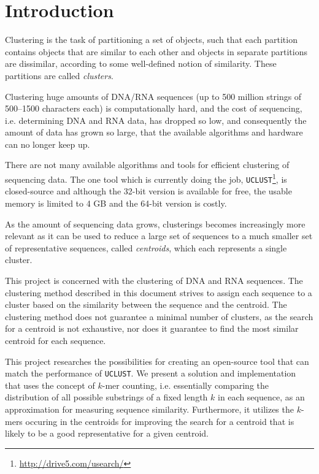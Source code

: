 \section{Introduction}

Clustering is the task of partitioning a set of objects, such that each
partition contains objects that are similar to each other and objects in
separate partitions are dissimilar, according to some well-defined notion of
similarity. These partitions are called \emph{clusters}.


Clustering huge amounts of DNA/RNA sequences (up to 500 million strings of
500--1500 characters each) is computationally hard, and the cost of sequencing,
i.e. determining DNA and RNA data, has dropped so low, and consequently the
amount of data has grown so large, that the available algorithms and hardware
can no longer keep up.~\cite{rothberg}

There are not many available algorithms and tools for efficient clustering of
sequencing data. The one tool which is currently doing the job,
\texttt{UCLUST}\footnote{\url{http://drive5.com/usearch/}}, is closed-source
and although the 32-bit version is available for free, the usable memory is
limited to 4 GB and the 64-bit version is costly.

As the amount of sequencing data grows, clusterings becomes increasingly more
relevant as it can be used to reduce a large set of sequences to a much smaller
set of representative sequences, called \emph{centroids}, which each represents
a single cluster.

This project is concerned with the clustering of DNA and RNA sequences. The
clustering method described in this document strives to assign each sequence to
a cluster based on the similarity between the sequence and the centroid. The
clustering method does not guarantee a minimal number of clusters, as the
search for a centroid is not exhaustive, nor does it guarantee to find the most
similar centroid for each sequence.

This project researches the possibilities for creating an open-source tool that
can match the performance of \texttt{UCLUST}. We present a solution and
implementation that uses the concept of $k$-mer counting, i.e. essentially
comparing the distribution of all possible substrings of a fixed length $k$ in
each sequence, as an approximation for measuring sequence similarity.
Furthermore, it utilizes the $k$-mers occuring in the centroids for improving
the search for a centroid that is likely to be a good representative for a
given centroid.

